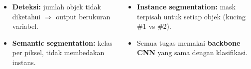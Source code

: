 \documentclass[t,aspectratio=169,xcolor=dvipsnames]{beamer}
\begin{document}
\begin{frame}
    \begin{columns}[T]
        \begin{itemize}
            \item \textbf{Deteksi:} jumlah objek tidak diketahui $\Rightarrow$ output berukuran variabel.
            \item \textbf{Semantic segmentation:} kelas per piksel, tidak membedakan instans.
        \end{itemize}
        \begin{itemize}
            \item \textbf{Instance segmentation:} mask terpisah untuk setiap objek (kucing \#1 vs \#2).
            \item Semua tugas memakai \textbf{backbone CNN} yang sama dengan klasifikasi.
        \end{itemize}
    \end{columns}
\end{frame}
\end{document}
